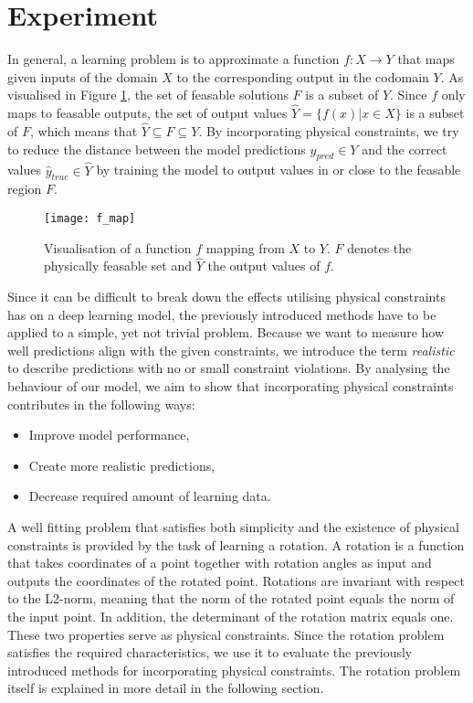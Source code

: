 \label{section:experiment}
\section{Experiment}
In general, a learning problem is to approximate a function $f: X \to Y$ that maps given inputs of the domain $X$ to the corresponding output in the codomain $Y$. As visualised in Figure \ref{fig:f_map}, the set of feasable solutions $F$ is a subset of $Y$. Since $f$ only maps to feasable outputs, the set of output values $\hat{Y} = \{f(x) | x \in X\}$ is a subset of $F$, which means that $\hat{Y} \subseteq F \subseteq Y$. By incorporating physical constraints, we try to reduce the distance between the model predictions $y_{pred} \in Y$ and the correct values $\hat{y}_{true} \in \hat{Y}$ by training the model to output values in or close to the feasable region $F$.
\begin{figure}[H]
	\texttt{[image: f\_map]}
	\caption{Visualisation of a function $f$ mapping from $X$ to $Y$. $F$ denotes the physically feasable set and $\hat{Y}$ the output values of $f$.}
	\label{fig:f_map}
\end{figure}
Since it can be difficult to break down the effects utilising physical constraints has on a deep learning model, the previously introduced methods have to be applied to a simple, yet not trivial problem. Because we want to measure how well predictions align with the given constraints, we introduce the term \textit{realistic} to describe predictions with no or small constraint violations. By analysing the behaviour of our model, we aim to show that incorporating physical constraints contributes in the following ways:
\begin{itemize}
	\item Improve model performance,
	\item Create more realistic predictions,
	\item Decrease required amount of learning data.
\end{itemize}
A well fitting problem that satisfies both simplicity and the existence of physical constraints is provided by the task of learning a rotation. A rotation is a function that takes coordinates of a point together with rotation angles as input and outputs the coordinates of the rotated point.  Rotations are invariant with respect to the L2-norm, meaning that the norm of the rotated point equals the norm of the input point. In addition, the determinant of the rotation matrix equals one. These two properties serve as physical constraints. Since the rotation problem satisfies the required characteristics, we use it to evaluate the previously introduced methods for incorporating physical constraints. The rotation problem itself is explained in more detail in the following section.

